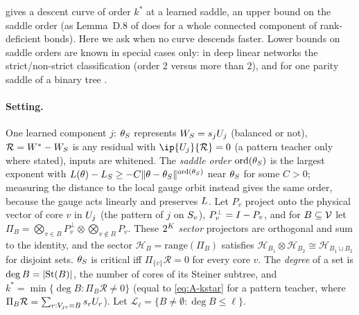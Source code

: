  gives a descent curve of order $k^*$ at a learned saddle, an upper bound on the
saddle order (as Lemma~D.8 of \citealp{furman2026benign} does for a whole connected component of
rank-deficient bonds). Here we ask when no curve descends faster. Lower bounds on saddle orders are
known in special cases only: in deep linear networks the strict/non-strict classification
\citep[Thm~7]{achour2024loss} (order $2$ versus more than $2$), and for one parity saddle of a binary tree
\citep[Prop.~5.3]{furman2026benign}.

\paragraph{Setting.} One learned component $j$: $\theta_S$ represents $W_S=s_{j}U_{j}$ (balanced or not),
$\mathcal R=W^{*}-W_S$ is any residual with $\ip{\U j}{\mathcal R}=0$ (a pattern teacher only where stated),
inputs are whitened. The \emph{saddle order} $\mathrm{ord}(\theta_S)$ is the largest exponent with
$L(\theta)-L_S\ge-C\lVert\theta-\theta_S\rVert^{\mathrm{ord}(\theta_S)}$ near $\theta_S$ for some $C>0$; measuring
the distance to the local gauge orbit instead gives the same order, because the gauge acts linearly and
preserves $L$. Let
$P_v$ project onto the physical vector of core $v$ in $U_{j}$ (the pattern of $j$ on $S_{v}$),
$P_v^\perp=I-P_v$, and for $B\subseteq\mathcal{V}$ let
$\Pi_B=\bigotimes_{v\in B}P_v^\perp\otimes\bigotimes_{v\notin B}P_v$. These $2^{K}$ \emph{sector}
projectors are orthogonal and sum to the identity, and the sector $\mathcal H_B=\mathrm{range}(\Pi_B)$
satisfies $\mathcal H_{B_1}\otimes\mathcal H_{B_2}\cong\mathcal H_{B_1\sqcup B_2}$ for disjoint sets.
$\theta_S$ is critical iff $\Pi_{\{v\}}\mathcal R=0$ for every core $v$. The \emph{degree} of a set is
$\deg B=\lvert\mathrm{St}(B)\rvert$, the number of cores of its Steiner subtree, and
$k^*=\min\{\deg B:\Pi_B\mathcal R\ne0\}$ (equal to \eqref{eq:A-kstar} for a pattern teacher, where
$\Pi_B\mathcal R=\sum_{r:V_{jr}=B}s_{r}U_{r}$). Let $\mathcal L_\ell=\{B\ne\emptyset:\deg B\le\ell\}$.

